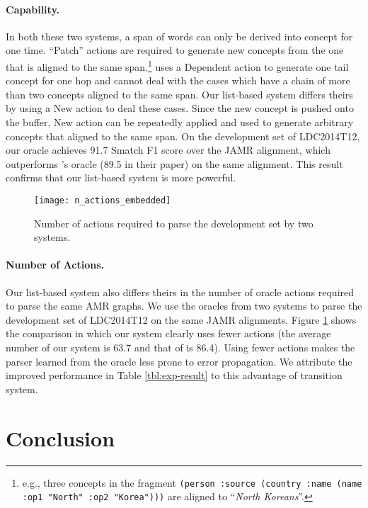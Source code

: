 \documentclass[11pt,a4paper]{article}
\begin{document}
\paragraph{Capability.} In both these two systems, a span of words can only be derived into concept for one time.
``Patch'' actions are required to generate new concepts from the one that 
is aligned to the same span.\footnote{
	e.g., three concepts in
	the fragment {\tt (person :source (country :name (name :op1 "North" :op2 "Korea")))}
	are aligned to ``{\it North Koreans}''.}
\citet{ballesteros-alonaizan:2017:EMNLP2017} uses a {\sc Dependent} action
to generate one tail concept for one hop and cannot deal with the cases
which have a chain of more than two concepts aligned to the same span.
Our list-based system differs theirs by using a {\sc New} action to deal these cases.
Since the new concept is pushed onto the buffer, {\sc New} action can be repeatedly
applied and used to generate arbitrary concepts that aligned to the same span. 
On the development set of LDC2014T12, our oracle achieves 91.7 Smatch F1 score
over the JAMR alignment, which outperforms \citet{ballesteros-alonaizan:2017:EMNLP2017}'s oracle 
(89.5 in their paper) on the same alignment.
This result confirms that our list-based system is more
powerful.

\begin{figure}
	\texttt{[image: n\_actions\_embedded]}
	\caption{Number of actions required to 
		parse the development set by two systems.}\label{fig:tok_act}
\end{figure}

\paragraph{Number of Actions.} Our list-based system also differs theirs in the number of
oracle actions required to parse the same AMR graphs.
We use the oracles from two systems to parse the development set of LDC2014T12
on the same JAMR alignments.
Figure \ref{fig:tok_act} shows the comparison in which our system
clearly uses fewer actions (the average number of our system is 63.7 and that of
\citet{ballesteros-alonaizan:2017:EMNLP2017} is 86.4).
Using fewer actions makes the parser learned from the oracle less
prone to error propagation. 
We attribute the improved performance in Table \ref{tbl:exp-result}
to this advantage of transition system.


\section{Conclusion}
\end{document}
